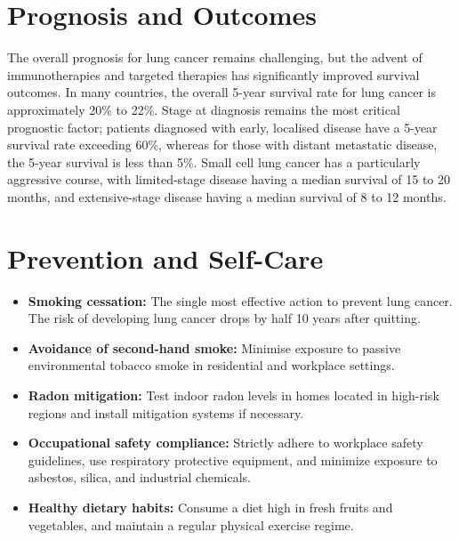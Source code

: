 \section*{Prognosis and Outcomes}
The overall prognosis for lung cancer remains challenging, but the advent of immunotherapies and targeted therapies has significantly improved survival outcomes. In many countries, the overall 5-year survival rate for lung cancer is approximately 20\% to 22\%. Stage at diagnosis remains the most critical prognostic factor; patients diagnosed with early, localised disease have a 5-year survival rate exceeding 60\%, whereas for those with distant metastatic disease, the 5-year survival is less than 5\%. Small cell lung cancer has a particularly aggressive course, with limited-stage disease having a median survival of 15 to 20 months, and extensive-stage disease having a median survival of 8 to 12 months.

\section*{Prevention and Self-Care}
\begin{itemize}
    \item \textbf{Smoking cessation:} The single most effective action to prevent lung cancer. The risk of developing lung cancer drops by half 10 years after quitting.
    \item \textbf{Avoidance of second-hand smoke:} Minimise exposure to passive environmental tobacco smoke in residential and workplace settings.
    \item \textbf{Radon mitigation:} Test indoor radon levels in homes located in high-risk regions and install mitigation systems if necessary.
    \item \textbf{Occupational safety compliance:} Strictly adhere to workplace safety guidelines, use respiratory protective equipment, and minimize exposure to asbestos, silica, and industrial chemicals.
    \item \textbf{Healthy dietary habits:} Consume a diet high in fresh fruits and vegetables, and maintain a regular physical exercise regime.
\end{itemize}

